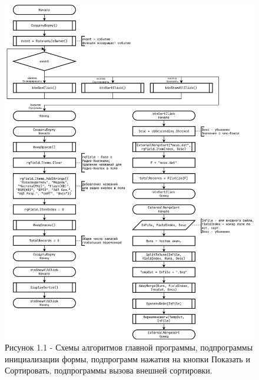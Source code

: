 \documentclass[oneside,a4paper,14pt]{extarticle}
\begin{document}
\clearpage
\begin{figure}[H]
	\centering
	\includegraphics[height=0.85\textheight]{pics/flowchart1.png}
	\caption*{Рисунок 1.1 - Схемы алгоритмов главной программы, подпрограммы инициализации формы, подпрограмм нажатия на кнопки Показать и Сортировать, подпрограммы вызова внешней сортировки.}
\end{figure}
\end{document}
